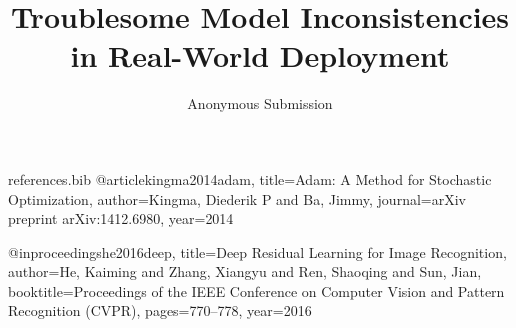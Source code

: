 \begin{filecontents}{references.bib}
@article{kingma2014adam,
  title={Adam: A Method for Stochastic Optimization},
  author={Kingma, Diederik P and Ba, Jimmy},
  journal={arXiv preprint arXiv:1412.6980},
  year={2014}
}

@inproceedings{he2016deep,
  title={Deep Residual Learning for Image Recognition},
  author={He, Kaiming and Zhang, Xiangyu and Ren, Shaoqing and Sun, Jian},
  booktitle={Proceedings of the IEEE Conference on Computer Vision and Pattern Recognition (CVPR)},
  pages={770--778},
  year={2016}
}
\end{filecontents}

\documentclass{article}

\usepackage[table]{xcolor}
\usepackage{graphicx}
\usepackage{natbib}
\usepackage{url}

\usepackage[margin=1in]{geometry}

\graphicspath{{figures/}}

\title{Troublesome Model Inconsistencies in Real-World Deployment}
\author{Anonymous Submission}
\date{}



\maketitle

\begin{abstract}
Deep learning systems often present unexpected pitfalls when moved from controlled research environs to real-world settings. We investigate subtle inconsistencies in training behaviors, revealing partially negative or inconclusive results. Our findings can guide better deployment strategies and highlight the need for caution when relying on standard training heuristics.
\end{abstract}

\section{Introduction}
Real-world deployment of deep neural networks frequently exposes brittleness and setbacks not obvious in controlled benchmarks. In this paper, we analyze inconsistencies observed when fine-tuning with standard optimizers \citep{kingma2014adam} and network backbones \citep{he2016deep}, focusing on problems such as training collapse in certain conditions. Although we attempted multiple adjustments (e.g., modest hyperparameter tuning, alternative layer initializations), many improvements were incremental or inconclusive. These challenges merit attention because of deployment safety and reliability implications.

